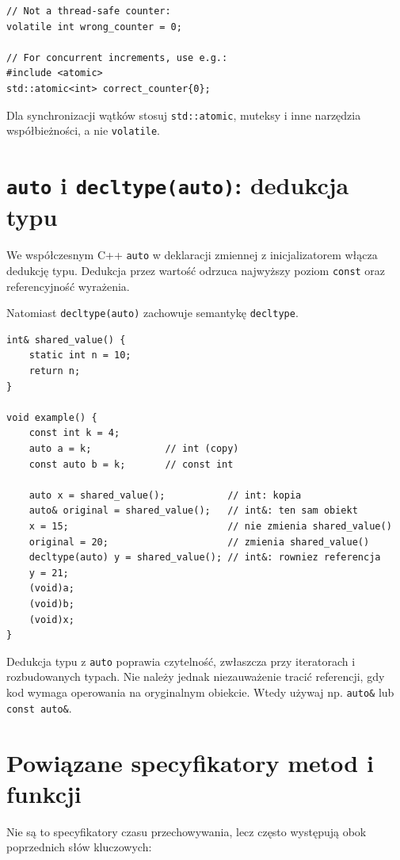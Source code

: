 \begin{lstlisting}
// Not a thread-safe counter:
volatile int wrong_counter = 0;

// For concurrent increments, use e.g.:
#include <atomic>
std::atomic<int> correct_counter{0};
\end{lstlisting}

Dla synchronizacji wątków stosuj \texttt{std::atomic}, muteksy i inne
narzędzia współbieżności, a nie \texttt{volatile}.

\section{\texttt{auto} i \texttt{decltype(auto)}: dedukcja typu}

We współczesnym C++ \texttt{auto} w deklaracji zmiennej z inicjalizatorem
włącza dedukcję typu. Dedukcja przez wartość odrzuca
najwyższy poziom \texttt{const} oraz referencyjność wyrażenia.

Natomiast \texttt{decltype(auto)} zachowuje semantykę \texttt{decltype}.

\begin{lstlisting}
int& shared_value() {
    static int n = 10;
    return n;
}

void example() {
    const int k = 4;
    auto a = k;             // int (copy)
    const auto b = k;       // const int

    auto x = shared_value();           // int: kopia
    auto& original = shared_value();   // int&: ten sam obiekt
    x = 15;                            // nie zmienia shared_value()
    original = 20;                     // zmienia shared_value()
    decltype(auto) y = shared_value(); // int&: rowniez referencja
    y = 21;
    (void)a;
    (void)b;
    (void)x;
}
\end{lstlisting}

Dedukcja typu z \texttt{auto} poprawia czytelność, zwłaszcza
przy iteratorach i rozbudowanych typach. Nie należy jednak
niezauważenie tracić referencji, gdy kod wymaga operowania
na oryginalnym obiekcie. Wtedy używaj np. \texttt{auto\&} lub
\texttt{const auto\&}.

\section{Powiązane specyfikatory metod i funkcji}

Nie są to specyfikatory czasu przechowywania, lecz często występują
obok poprzednich słów kluczowych:

